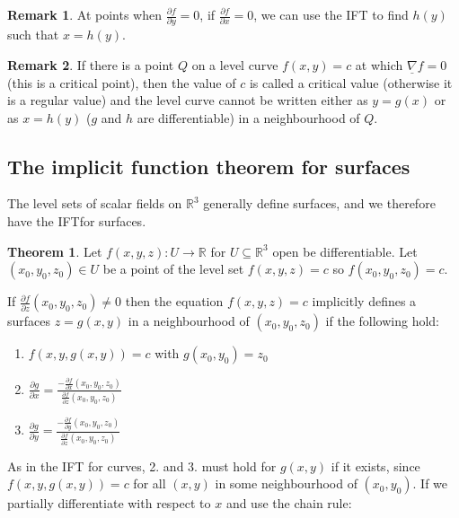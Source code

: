 \documentclass[12pt,a4paper]{article}
\theoremstyle{definition}
\newtheorem{theorem}[definition]{Theorem}
\newtheorem*{remark}{Remark}
\begin{document}
\begin{remark}
	At points when $\frac{\partial f}{\partial y} = 0$, if $\frac{\partial f}{\partial x} = 0$, we can use the IFT to find $h(y)$ such that $x = h(y)$.
\end{remark}

\begin{remark}
	If there is a point $Q$ on a level curve $f(x, y) = c$ at which $\underline{\nabla} f = 0$ (this is a critical point), then the value of $c$ is called a critical value (otherwise it is a regular value) and the level curve cannot be written either as $y = g(x)$ or as $x = h(y)$ ($g$ and $h$ are differentiable) in a neighbourhood of $Q$.
\end{remark}

\subsection{The implicit function theorem for surfaces}

The level sets of scalar fields on $\mathbb{R}^3$ generally define surfaces, and we therefore have the IFTfor surfaces.

\begin{theorem}
	Let $f(x, y, z): U \rightarrow \mathbb{R}$ for $U \subseteq \mathbb{R}^3$ open be differentiable. Let $(x_0, y_0, z_0) \in U$ be a point of the level set $f(x, y, z) = c$ so $f(x_0, y_0, z_0) = c$.

	If $\frac{\partial f}{\partial z} (x_0, y_0, z_0) \ne 0$ then the equation $f(x, y, z) = c$ implicitly defines a surfaces $z = g(x, y)$ in a neighbourhood of $(x_0, y_0, z_0)$ if the following hold:
	\begin{enumerate}
		\item $f(x, y, g(x, y)) = c$ with $g(x_0, y_0) = z_0$
		\item $\frac{\partial g}{\partial x} = \frac{-\frac{\partial f}{\partial x} (x_0, y_0, z_0)}{\frac{\partial f}{\partial z} (x_0, y_0, z_0)}$
		\item $\frac{\partial g}{\partial y} = \frac{-\frac{\partial f}{\partial y} (x_0, y_0, z_0)}{\frac{\partial f}{\partial z} (x_0, y_0, z_0)}$
	\end{enumerate}
\end{theorem}

As in the IFT for curves, 2. and 3. must hold for $g(x, y)$ if it exists, since $f(x, y, g(x, y)) = c$ for all $(x, y)$ in some neighbourhood of $(x_0, y_0)$. If we partially differentiate with respect to $x$ and use the chain rule:
\end{document}
